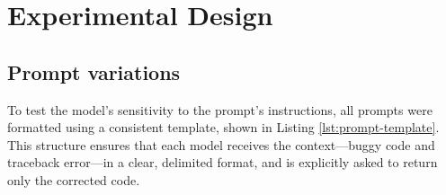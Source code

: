 
\section{Experimental Design}
\subsection{Prompt variations}

To test the model's sensitivity to the prompt's instructions, all prompts were formatted 
using a consistent template, shown in Listing \ref{lst:prompt-template}. This structure ensures 
that each model receives the context—buggy code and traceback error—in a clear, delimited 
format, and is explicitly asked to return only the corrected code.

